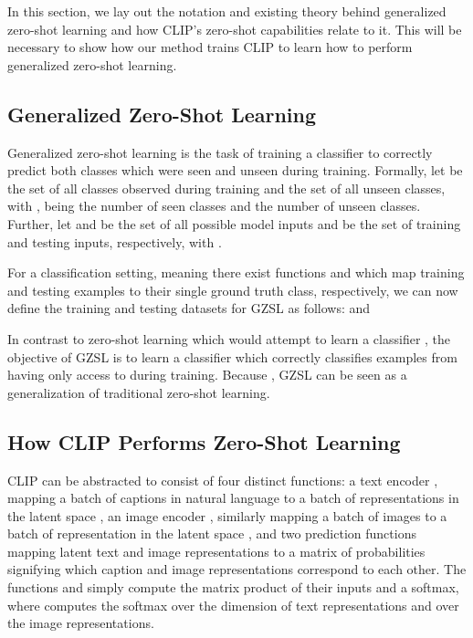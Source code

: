 \documentclass{article}
\begin{document}
In this section, we lay out the notation and existing theory behind generalized zero-shot learning and how CLIP's zero-shot capabilities relate to it. This will be necessary to show how our method trains CLIP to learn how to perform generalized zero-shot learning.

\subsection{Generalized Zero-Shot Learning}

Generalized zero-shot learning is the task of training a classifier to correctly predict both classes which were seen and unseen during training. Formally, let  be the set of all classes observed during training and  the set of all unseen classes, with ,  being the number of seen classes and  the number of unseen classes. Further, let  and  be the set of all possible model inputs and  be the set of training and testing inputs, respectively, with .

For a classification setting, meaning there exist functions  and  which map training and testing examples to their single ground truth class, respectively, we can now define the training and testing datasets for GZSL as follows:  and 

In contrast to zero-shot learning which would attempt to learn a classifier , the objective of GZSL is to learn a classifier  which correctly classifies examples from  having only access to  during training. Because , GZSL can be seen as a generalization of traditional zero-shot learning.

\subsection{How CLIP Performs Zero-Shot Learning}
\label{sec_clip_math}

CLIP can be abstracted to consist of four distinct functions: a text encoder , mapping a batch of captions in natural language  to a batch of representations in the latent space , an image encoder , similarly mapping a batch of images  to a batch of representation in the latent space , and two prediction functions  mapping  latent text and image representations to a matrix of probabilities signifying which caption and image representations correspond to each other. The functions  and  simply compute the matrix product of their inputs and a softmax, where  computes the softmax over the dimension of text representations and  over the image representations.
\end{document}
